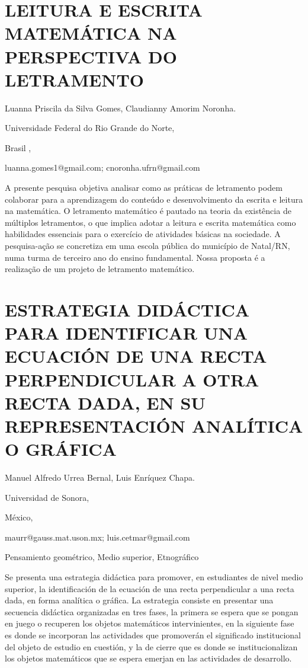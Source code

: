 \section{LEITURA E ESCRITA MATEMÁTICA NA PERSPECTIVA DO LETRAMENTO}

\begin{datos}

Luanna Priscila da Silva Gomes, Claudianny Amorim Noronha.

Universidade Federal do Rio Grande do Norte,

Brasil ,

luanna.gomes1@gmail.com; cnoronha.ufrn@gmail.com 

\end{datos}

A presente pesquisa objetiva analisar como as práticas de letramento
podem colaborar para a aprendizagem do conteúdo e desenvolvimento
da escrita e leitura na matemática. O letramento matemático é pautado
na teoria da existência de múltiplos letramentos, o que implica adotar
a leitura e escrita matemática como habilidades essenciais para o
exercício de atividades básicas na sociedade. A pesquisa-ação se concretiza
em uma escola pública do município de Natal/RN, numa turma de terceiro
ano do ensino fundamental. Nossa proposta é a realização de um projeto
de letramento matemático. 

\setcounter{section}{240}


\section{ESTRATEGIA DIDÁCTICA PARA IDENTIFICAR UNA ECUACIÓN DE UNA RECTA PERPENDICULAR
A OTRA RECTA DADA, EN SU REPRESENTACIÓN ANALÍTICA O GRÁFICA }

\begin{datos}

Manuel Alfredo Urrea Bernal, Luis Enríquez Chapa.

Universidad de Sonora,

México,

maurr@gauss.mat.uson.mx; luis.cetmar@gmail.com 

\end{datos}

Pensamiento geométrico, Medio superior, Etnográfico

Se presenta una estrategia didáctica para promover, en estudiantes
de nivel medio superior, la identificación de la ecuación de una recta
perpendicular a una recta dada, en forma analítica o gráfica. La estrategia
consiste en presentar una secuencia didáctica organizadas en tres
fases, la primera se espera que se pongan en juego o recuperen los
objetos matemáticos intervinientes, en la siguiente fase es donde
se incorporan las actividades que promoverán el significado institucional
del objeto de estudio en cuestión, y la de cierre que es donde se
institucionalizan los objetos matemáticos que se espera emerjan en
las actividades de desarrollo. 


